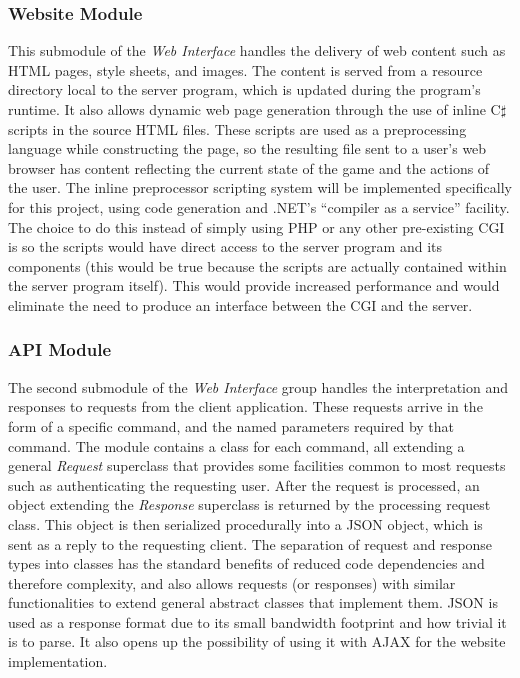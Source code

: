 \subsubsection{Website Module}
This submodule of the \emph{Web Interface} handles the delivery of web content such as HTML pages, style sheets, and images. The content is served from a resource directory local to the server program, which is updated during the program's runtime. It also allows dynamic web page generation through the use of inline C$\sharp$ scripts in the source HTML files. These scripts are used as a preprocessing language while constructing the page, so the resulting file sent to a user's web browser has content reflecting the current state of the game and the actions of the user. The inline preprocessor scripting system will be implemented specifically for this project, using code generation and .NET's ``compiler as a service'' facility. The choice to do this instead of simply using PHP or any other pre-existing CGI is so the scripts would have direct access to the server program and its components (this would be true because the scripts are actually contained within the server program itself). This would provide increased performance and would eliminate the need to produce an interface between the CGI and the server.

\subsubsection{API Module}
The second submodule of the \emph{Web Interface} group handles the interpretation and responses to requests from the client application. These requests arrive in the form of a specific command, and the named parameters required by that command. The module contains a class for each command, all extending a general \emph{Request} superclass that provides some facilities common to most requests such as authenticating the requesting user. After the request is processed, an object extending the \emph{Response} superclass is returned by the processing request class. This object is then serialized procedurally into a JSON object, which is sent as a reply to the requesting client. The separation of request and response types into classes has the standard benefits of reduced code dependencies and therefore complexity, and also allows requests (or responses) with similar functionalities to extend general abstract classes that implement them. JSON is used as a response format due to its small bandwidth footprint and how trivial it is to parse. It also opens up the possibility of using it with AJAX for the website implementation.

